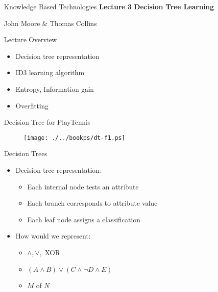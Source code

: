 \documentclass[%
pdf,
colorBG,
slideColor,
tcrico,
]{prosper}
\begin{document}
\begin{slide}{Knowledge Based Technologies}
\large
\textbf{Lecture 3} 
\newline
\textbf{Decision Tree Learning}

\small
John Moore \& Thomas Collins

\end{slide}



\begin{slide}{Lecture Overview}
\begin{itemize}
\item Decision tree representation
\item ID3 learning algorithm
\item Entropy, Information gain
\item Overfitting
\end{itemize}
\end{slide}



\begin{slide}{Decision Tree for PlayTennis}
\begin{figure}
	\centering
	\texttt{[image: ./../bookps/dt-f1.ps]}
\end{figure}
\end{slide}



\begin{slide}{Decision Trees \red \ }
\begin{itemize}
 \item Decision tree representation:
	\begin{itemize}
	\item Each internal node tests an attribute
	\item Each branch corresponds to attribute value
	\item Each leaf node assigns a classification
	\end{itemize}
\item How would we represent:
	\begin{itemize}
	\item $\wedge, \vee,$ XOR
	\item $(A \wedge B) \vee (C \wedge \neg D \wedge E)$
	\item $M$ of $N$
\end{itemize}
\end{itemize}
\end{slide}
\end{document}
